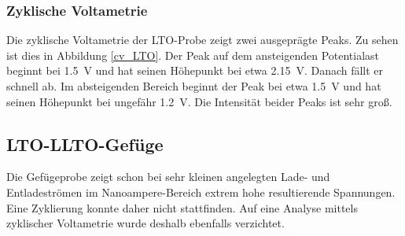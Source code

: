 \documentclass[a4paper, 11pt, headsepline,footsepline,twoside,abstract]{scrbook}
\begin{document}
\subsubsection{Zyklische Voltametrie}
Die zyklische Voltametrie der LTO-Probe zeigt zwei ausgeprägte Peaks. Zu sehen ist dies in Abbildung \ref{cv_LTO}. Der Peak auf dem ansteigenden Potentialast beginnt bei \SI{1.5}{\volt} und hat seinen Höhepunkt bei etwa \SI{2.15}{\volt}. Danach fällt er schnell ab. Im absteigenden Bereich beginnt der Peak bei etwa \SI{1.5}{\volt} und hat seinen Höhepunkt bei ungefähr \SI{1.2}{\volt}. Die Intensität beider Peaks ist sehr groß.
\subsection{LTO-LLTO-Gefüge}
Die Gefügeprobe zeigt schon bei sehr kleinen angelegten Lade- und Entladeströmen im Nanoampere-Bereich extrem hohe resultierende Spannungen. Eine Zyklierung konnte daher nicht stattfinden. Auf eine Analyse mittels zyklischer Voltametrie wurde deshalb ebenfalls verzichtet.
\end{document}

